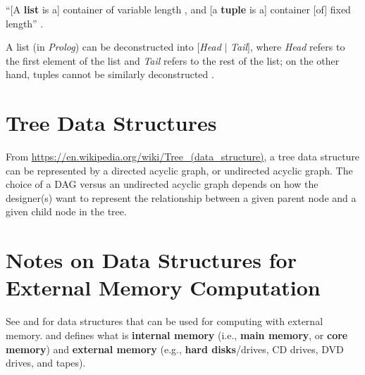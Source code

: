 ``[A {\bf list} is a] container of variable length , and [a {\bf tuple} is a] container [of] fixed length'' \cite[\S4.3 pp. 111]{Tate2010}.

A list (in {\it Prolog}) can be deconstructed into $[${\it Head} $|$ {\it Tail}$]$, where {\it Head} refers to the first element of the list and {\it Tail} refers to the rest of the list; on the other hand, tuples cannot be similarly deconstructed \cite[\S4.3 pp. 113]{Tate2010}.




\section{Tree Data Structures}
\label{sec:TreeDataStructures}


From \url{https://en.wikipedia.org/wiki/Tree_(data_structure)}, a tree data structure can be represented by a directed acyclic graph, or undirected acyclic graph. The choice of a DAG versus an undirected acyclic graph depends on how the designer(s) want to represent the relationship between a given parent node and a given child node in the tree.














\section{Notes on Data Structures for External Memory Computation}
\label{sec:NotesOnDataStructuresForExternalMemoryComputation}

See \cite[\S14.3]{Goodrich2011} and \cite[\S15.3]{Goodrich2013} for data structures that can be used for computing with external memory. \cite[\S14.2.1]{Goodrich2011} and \cite[\S15.2.1]{Goodrich2013} defines what is {\bf internal memory} (i.e., {\bf main memory}, or {\bf core memory}) and {\bf external memory} (e.g., {\bf hard disks}/drives, CD drives, DVD drives, and tapes).





